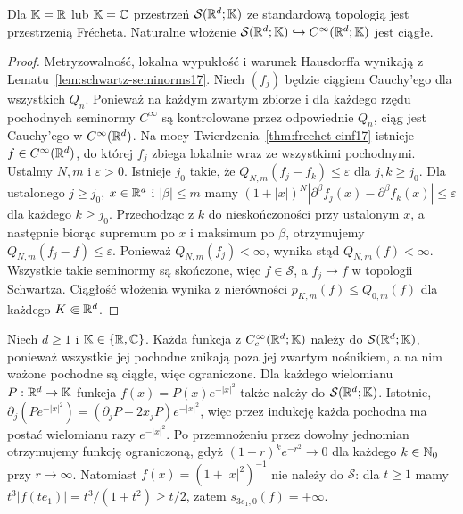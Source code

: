 \begin{twierdzenie}
\label{thm:schwartz-frechet17}
Dla $\mathbb K=\mathbb R$ lub $\mathbb K=\mathbb C$ przestrzeń $\mathcal S(\mathbb R^d;\mathbb K)$
ze standardową topologią jest przestrzenią Frécheta.
Naturalne włożenie $\mathcal S(\mathbb R^d;\mathbb K)\hookrightarrow
C^\infty(\mathbb R^d;\mathbb K)$ jest ciągłe.
\end{twierdzenie}
\begin{proof}
Metryzowalność, lokalna wypukłość i warunek Hausdorffa wynikają z
Lematu~\ref{lem:schwartz-seminorms17}.
Niech $(f_j)$ będzie ciągiem Cauchy'ego dla wszystkich $Q_n$.
Ponieważ na każdym zwartym zbiorze i dla każdego rzędu pochodnych
seminormy $C^\infty$ są kontrolowane przez odpowiednie $Q_n$,
ciąg jest Cauchy'ego w $C^\infty(\mathbb R^d)$.
Na mocy Twierdzenia~\ref{thm:frechet-cinf17} istnieje
$f\in C^\infty(\mathbb R^d)$, do której $f_j$ zbiega lokalnie
wraz ze wszystkimi pochodnymi.
Ustalmy $N,m$ i $\varepsilon>0$. Istnieje $j_0$ takie, że
$Q_{N,m}(f_j-f_k)\le\varepsilon$ dla $j,k\ge j_0$.
Dla ustalonego $j\ge j_0$, $x\in\mathbb R^d$ i $|\beta|\le m$
mamy $(1+|x|)^N|\partial^\beta f_j(x)-\partial^\beta f_k(x)|
\le\varepsilon$ dla każdego $k\ge j_0$.
Przechodząc z $k$ do nieskończoności przy ustalonym $x$,
a następnie biorąc supremum po $x$ i maksimum po $\beta$,
otrzymujemy $Q_{N,m}(f_j-f)\le\varepsilon$.
Ponieważ $Q_{N,m}(f_j)<\infty$, wynika stąd
$Q_{N,m}(f)<\infty$. Wszystkie takie seminormy są skończone,
więc $f\in\mathcal S$, a $f_j\to f$ w topologii Schwartza.
Ciągłość włożenia wynika z nierówności
$p_{K,m}(f)\le Q_{0,m}(f)$ dla każdego $K\Subset\mathbb R^d$.
\end{proof}

\begin{przyklad}
\label{ex:schwartz-functions17}
Niech $d\ge1$ i $\mathbb K\in\{\mathbb R,\mathbb C\}$.
Każda funkcja z $C_c^\infty(\mathbb R^d;\mathbb K)$ należy do
$\mathcal S(\mathbb R^d;\mathbb K)$, ponieważ wszystkie jej pochodne
znikają poza jej zwartym nośnikiem, a na nim
ważone pochodne są ciągłe, więc ograniczone.
Dla każdego wielomianu $P:\mathbb R^d\to\mathbb K$ funkcja
$f(x)=P(x)e^{-|x|^2}$ także należy do $\mathcal S(\mathbb R^d;\mathbb K)$.
Istotnie, $\partial_j(Pe^{-|x|^2})=
(\partial_jP-2x_jP)e^{-|x|^2}$, więc przez indukcję
każda pochodna ma postać wielomianu razy $e^{-|x|^2}$.
Po przemnożeniu przez dowolny jednomian otrzymujemy
funkcję ograniczoną, gdyż $(1+r)^k e^{-r^2}\to0$
dla każdego $k\in\mathbb N_0$ przy $r\to\infty$.
Natomiast $f(x)=(1+|x|^2)^{-1}$ nie należy do $\mathcal S$:
dla $t\ge1$ mamy $t^3|f(te_1)|=t^3/(1+t^2)\ge t/2$,
zatem $s_{3e_1,0}(f)=+\infty$.
\end{przyklad}

